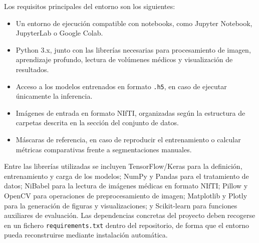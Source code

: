 Los requisitos principales del entorno son los siguientes:

\begin{itemize}
    \item Un entorno de ejecución compatible con notebooks, como Jupyter Notebook, JupyterLab o Google Colab.
    \item Python 3.x, junto con las librerías necesarias para procesamiento de imagen, aprendizaje profundo, lectura de volúmenes médicos y visualización de resultados.
    \item Acceso a los modelos entrenados en formato \texttt{.h5}, en caso de ejecutar únicamente la inferencia.
    \item Imágenes de entrada en formato NIfTI, organizadas según la estructura de carpetas descrita en la sección del conjunto de datos.
    \item Máscaras de referencia, en caso de reproducir el entrenamiento o calcular métricas comparativas frente a segmentaciones manuales.
\end{itemize}

Entre las librerías utilizadas se incluyen TensorFlow/Keras para la definición, entrenamiento y carga de los modelos; NumPy y Pandas para el tratamiento de datos; NiBabel para la lectura de imágenes médicas en formato NIfTI; Pillow y OpenCV para operaciones de preprocesamiento de imagen; Matplotlib y Plotly para la generación de figuras y visualizaciones; y Scikit-learn para funciones auxiliares de evaluación. Las dependencias concretas del proyecto deben recogerse en un fichero \texttt{requirements.txt} dentro del repositorio, de forma que el entorno pueda reconstruirse mediante instalación automática.

